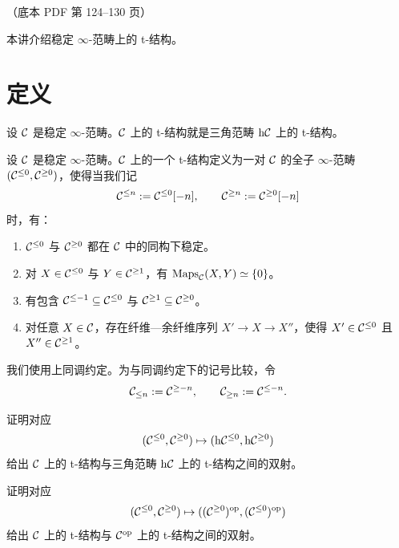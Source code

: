 \begin{center}\small\color{black!55}（底本 PDF 第 124–130 页）\end{center}

本讲介绍稳定 $\infty$-范畴上的 t-结构。

\section{定义}

\nitem\label{L16-1.1} 设 $\mathcal{C}$ 是稳定 $\infty$-范畴。$\mathcal{C}$ 上的 t-结构就是三角范畴 $\mathrm{h}\mathcal{C}$ 上的 t-结构。

\begin{definition}\label{L16-1.2}
设 $\mathcal{C}$ 是稳定 $\infty$-范畴。$\mathcal{C}$ 上的一个 t-结构定义为一对 $\mathcal{C}$ 的全子 $\infty$-范畴 $(\mathcal{C}^{\le0},\mathcal{C}^{\ge0})$，使得当我们记
\[
\mathcal{C}^{\le n}:=\mathcal{C}^{\le0}[-n],\qquad \mathcal{C}^{\ge n}:=\mathcal{C}^{\ge0}[-n]
\]
时，有：
\begin{enumerate}[label=(\arabic*),start=0,leftmargin=2.4em,itemsep=0.1em]
\item $\mathcal{C}^{\le0}$ 与 $\mathcal{C}^{\ge0}$ 都在 $\mathcal{C}$ 中的同构下稳定。
\item 对 $X\in\mathcal{C}^{\le0}$ 与 $Y\in\mathcal{C}^{\ge1}$，有 $\operatorname{Maps}_{\mathcal{C}}(X,Y)\simeq\{0\}$。
\item 有包含 $\mathcal{C}^{\le-1}\subseteq\mathcal{C}^{\le0}$ 与 $\mathcal{C}^{\ge1}\subseteq\mathcal{C}^{\ge0}$。
\item 对任意 $X\in\mathcal{C}$，存在纤维—余纤维序列 $X'\to X\to X''$，使得 $X'\in\mathcal{C}^{\le0}$ 且 $X''\in\mathcal{C}^{\ge1}$。
\end{enumerate}
\end{definition}

\begin{warning}\label{L16-1.3}
我们使用上同调约定。为与同调约定下的记号比较，令
\[
\mathcal{C}_{\le n}:=\mathcal{C}^{\ge-n},\qquad \mathcal{C}_{\ge n}:=\mathcal{C}^{\le-n}.
\]
\end{warning}

\begin{exercise}\label{L16-1.4}
证明对应
\[
(\mathcal{C}^{\le0},\mathcal{C}^{\ge0})\mapsto(\mathrm{h}\mathcal{C}^{\le0},\mathrm{h}\mathcal{C}^{\ge0})
\]
给出 $\mathcal{C}$ 上的 t-结构与三角范畴 $\mathrm{h}\mathcal{C}$ 上的 t-结构之间的双射。
\end{exercise}

\begin{exercise}\label{L16-1.5}
证明对应
\[
(\mathcal{C}^{\le0},\mathcal{C}^{\ge0})\mapsto((\mathcal{C}^{\ge0})^{\mathrm{op}},(\mathcal{C}^{\le0})^{\mathrm{op}})
\]
给出 $\mathcal{C}$ 上的 t-结构与 $\mathcal{C}^{\mathrm{op}}$ 上的 t-结构之间的双射。
\end{exercise}

